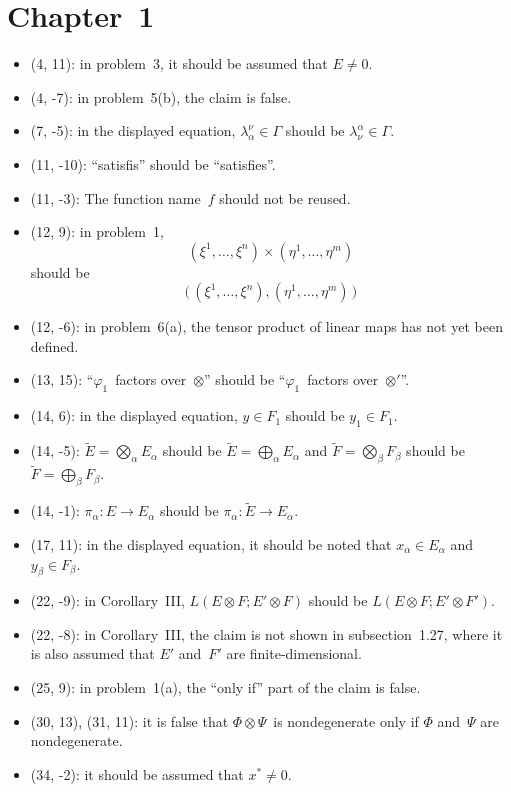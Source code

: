 \documentclass[letterpaper,12pt]{article}
\newcommand{\bigdsum}{\bigoplus}
\newcommand{\tprod}{\otimes}
\newcommand{\bigtprod}{\bigotimes}
\begin{document}
\section*{Chapter~1}
\begin{itemize}
\item (4, 11): in problem~3, it should be assumed that \(E\ne 0\).
\item (4, -7): in problem~5(b), the claim is false.
\item (7, -5): in the displayed equation, \(\lambda^{\nu}_{\alpha}\in\Gamma\) should be \(\lambda^{\alpha}_{\nu}\in\Gamma\).
\item (11, -10): ``satisfis'' should be ``satisfies''.
\item (11, -3): The function name~\(f\) should not be reused.
\item (12, 9): in problem~1,
\[(\xi^1,\ldots,\xi^n)\times(\eta^1,\ldots,\eta^m)\]
should be
\[\bigl(\,(\xi^1,\ldots,\xi^n),(\eta^1,\ldots,\eta^m)\,\bigr)\]
\item (12, -6): in problem~6(a), the tensor product of linear maps has not yet been defined.
\item (13, 15): ``\(\varphi_1\)~factors over~\(\tprod\)'' should be ``\(\varphi_1\)~factors over~\(\tprod'\)''.
\item (14, 6): in the displayed equation, \(y\in F_1\) should be \(y_1\in F_1\).
\item (14, -5): \(\widetilde{E}=\bigtprod_{\alpha}E_{\alpha}\) should be \(\widetilde{E}=\bigdsum_{\alpha}E_{\alpha}\) and \(\widetilde{F}=\bigtprod_{\beta}F_{\beta}\) should be \(\widetilde{F}=\bigdsum_{\beta}F_{\beta}\).
\item (14, -1): \(\pi_{\alpha}:E\to E_{\alpha}\) should be \(\pi_{\alpha}:\widetilde{E}\to E_{\alpha}\).
\item (17, 11): in the displayed equation, it should be noted that \(x_{\alpha}\in E_{\alpha}\) and \(y_{\beta}\in F_{\beta}\).
\item (22, -9): in Corollary~III, \(L(E\tprod F;E'\tprod F)\) should be \(L(E\tprod F;E'\tprod F')\).
\item (22, -8): in Corollary~III, the claim is not shown in subsection~1.27, where it is also assumed that \(E'\) and~\(F'\) are finite-dimensional.
\item (25, 9): in problem~1(a), the ``only if'' part of the claim is false.
\item (30, 13), (31, 11): it is false that \(\Phi\tprod\Psi\)~is nondegenerate only if \(\Phi\) and~\(\Psi\) are nondegenerate.
\item (34, -2): it should be assumed that \(x^*\ne 0\).

\end{itemize}
\end{document}
